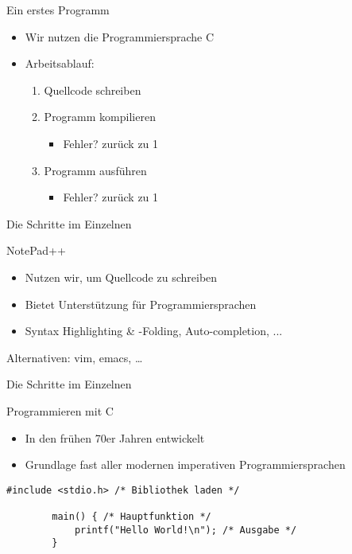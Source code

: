 \documentclass[10pt]{beamer} %
\begin{document}
\begin{frame}{Ein erstes Programm}
	
	\begin{itemize}
		\item Wir nutzen die Programmiersprache C
		\item Arbeitsablauf:
		\begin{enumerate}
			\item Quellcode schreiben
			\item Programm kompilieren
			\begin{itemize}
				\item Fehler? \rto zurück zu 1
			\end{itemize}
			\item Programm ausführen
			\begin{itemize}
				\item Fehler? \rto zurück zu 1
			\end{itemize}
		\end{enumerate}
	\end{itemize}
	
\end{frame}

\begin{frame}{Die Schritte im Einzelnen}
	
	NotePad++ 
	\begin{itemize}
		\item Nutzen wir, um Quellcode zu schreiben
		\item Bietet Unterstützung für Programmiersprachen
		\item Syntax Highlighting \& -Folding, Auto-completion, ...
	\end{itemize}	
	
	Alternativen: vim, emacs, \dots
	
\end{frame}

\begin{frame}[fragile]{Die Schritte im Einzelnen}
	
	Programmieren mit C
	\begin{itemize}
		\item In den frühen 70er Jahren entwickelt
		\item Grundlage fast aller modernen imperativen Programmiersprachen
	\end{itemize}	
	
	\begin{lstlisting}[gobble=4]
		#include <stdio.h> /* Bibliothek laden */
		
		main() { /* Hauptfunktion */
			printf("Hello World!\n"); /* Ausgabe */
		}
	\end{lstlisting}
	
\end{frame}
\end{document}
